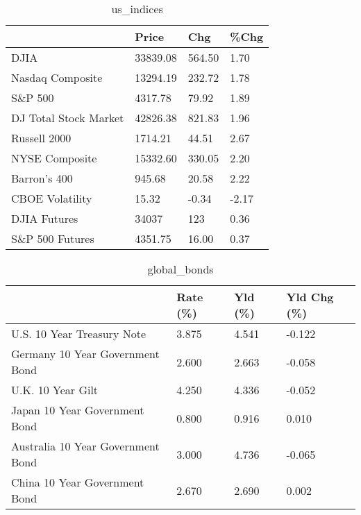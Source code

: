 \documentclass{article}%
\begin{document}
%


\begin{table}[htbp]%
\caption{us\_indices}%
\centering%
\begin{adjustbox}{width=1\textwidth}%
\begin{tabular}{llll}
\toprule
                      &    Price &    Chg &  \%Chg \\
\midrule
                 DJIA & 33839.08 & 564.50 &  1.70 \\
     Nasdaq Composite & 13294.19 & 232.72 &  1.78 \\
              S\&P 500 &  4317.78 &  79.92 &  1.89 \\
DJ Total Stock Market & 42826.38 & 821.83 &  1.96 \\
         Russell 2000 &  1714.21 &  44.51 &  2.67 \\
       NYSE Composite & 15332.60 & 330.05 &  2.20 \\
         Barron's 400 &   945.68 &  20.58 &  2.22 \\
      CBOE Volatility &    15.32 &  -0.34 & -2.17 \\
         DJIA Futures &    34037 &    123 &  0.36 \\
      S\&P 500 Futures &  4351.75 &  16.00 &  0.37 \\
\bottomrule
\end{tabular}
%
\end{adjustbox}%
\end{table}

%


\begin{table}[htbp]%
\caption{global\_bonds}%
\centering%
\begin{adjustbox}{width=1\textwidth}%
\begin{tabular}{llll}
\toprule
                                  & Rate (\%) & Yld (\%) & Yld Chg (\%) \\
\midrule
       U.S. 10 Year Treasury Note &    3.875 &   4.541 &      -0.122 \\
  Germany 10 Year Government Bond &    2.600 &   2.663 &      -0.058 \\
                U.K. 10 Year Gilt &    4.250 &   4.336 &      -0.052 \\
    Japan 10 Year Government Bond &    0.800 &   0.916 &       0.010 \\
Australia 10 Year Government Bond &    3.000 &   4.736 &      -0.065 \\
    China 10 Year Government Bond &    2.670 &   2.690 &       0.002 \\
\bottomrule
\end{tabular}
%
\end{adjustbox}%
\end{table}
\end{document}

